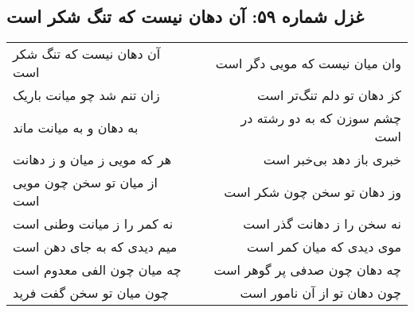 \begin{center}
\section*{غزل شماره ۵۹: آن دهان نیست که تنگ شکر است}
\label{sec:059}
\begin{longtable}{l p{0.5cm} r}
آن دهان نیست که تنگ شکر است
&&
وان میان نیست که مویی دگر است
\\
زان تنم شد چو میانت باریک
&&
کز دهان تو دلم تنگ‌تر است
\\
به دهان و به میانت ماند
&&
چشم سوزن که به دو رشته در است
\\
هر که مویی ز میان و ز دهانت
&&
خبری باز دهد بی‌خبر است
\\
از میان تو سخن چون مویی است
&&
وز دهان تو سخن چون شکر است
\\
نه کمر را ز میانت وطنی است
&&
نه سخن را ز دهانت گذر است
\\
میم دیدی که به جای دهن است
&&
موی دیدی که میان کمر است
\\
چه میان چون الفی معدوم است
&&
چه دهان چون صدفی پر گوهر است
\\
چون میان تو سخن گفت فرید
&&
چون دهان تو از آن نامور است
\\
\end{longtable}
\end{center}
